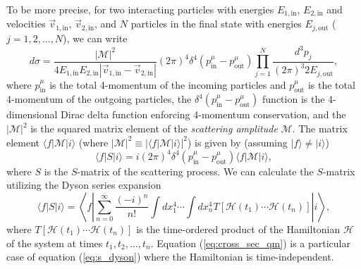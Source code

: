 To be more precise, for two interacting particles with energies $E_{1,{\text{in}}}$, $E_{2,{\text{in}}}$ and velocities $\vec{v}_{1,{\text{in}}}$, $\vec{v}_{2,{\text{in}}}$, and $N$ particles in the final state with energies $E_{j,{\text{out}}}$ ($j=1,2,..., N$), we can write \cite{schartz}
\begin{equation}
    \label{eq:cross_sec_qft}
    d \sigma = \frac{|\mathcal{M}|^2}{4 E_{1,{\text{in}}} E_{2,{\text{in}}} |\vec{v}_{1,{\text{in}}} - \vec{v}_{2,{\text{in}}}|} (2\pi)^4 \delta^4(p^\mu_{\text{in}} - p^\mu_{\text{out}}) \prod_{j=1}^N \frac{d^3 p_j}{(2\pi)^3 2E_{j, {\text{out}}}}, 
\end{equation}
where $p^\mu_{\text{in}}$ is the total 4-momentum of the incoming particles and $p^\mu_{\text{out}}$ is the total 4-momentum of the outgoing particles, the $\delta^4(p^\mu_{\text{in}} - p^\mu_{\text{out}})$ function is the 4-dimensional Dirac delta function enforcing 4-momentum conservation, and the $|\mathcal{M}|^2$ is the squared matrix element of the \emph{scattering amplitude} $\mathcal{M}$.
The matrix element $\langle f |\mathcal{M} | i \rangle$ (where $|\mathcal{M}|^2 \equiv |\langle f |\mathcal{M} | i \rangle |^2$) is given by (assuming $ | f \rangle \neq | i \rangle$)
\begin{equation}
    \label{eq:M_matrix}
    \langle f | S | i \rangle = i (2\pi)^4 \delta^4(p^\mu_{\text{in}} - p^\mu_{\text{out}})  \langle f | \mathcal{M} | i \rangle,
\end{equation}
where $S$ is the $S$-matrix of the scattering process.
We can calculate the $S$-matrix utilizing the Dyson series expansion \cite{schartz}
\begin{equation}
    \label{eq:s_dyson}
    \langle f | S | i \rangle =\left\langle f \left|\sum_{n=0}^{\infty} \frac{(-i)^n}{n !} \int d x_1^4 \cdots \int d x_n^4 T\left[\mathcal{H}\left(t_1\right) \cdots \mathcal{H}\left(t_n\right)\right]\right| i \right\rangle,
\end{equation}
where $T\left[\mathcal{H}\left(t_1\right) \cdots \mathcal{H}\left(t_n\right)\right]$ is the time-ordered product of the Hamiltonian $\mathcal{H}$ of the system at times $t_1, t_2, ..., t_n$.
Equation (\ref{eq:cross_sec_qm}) is a particular case of equation (\ref{eq:s_dyson}) where the Hamiltonian is time-independent.


